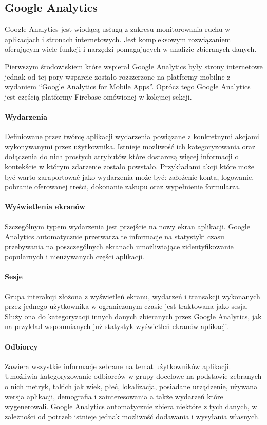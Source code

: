 \subsection{Google Analytics}
Google Analytics jest wiodącą usługą z zakresu monitorowania ruchu w aplikacjach i stronach internetowych. Jest kompleksowym rozwiązaniem oferującym wiele funkcji i narzędzi pomagających w analizie zbieranych danych.

Pierwszym środowiskiem które wspierał Google Analytics były strony internetowe jednak od tej pory wsparcie zostało rozszerzone na platformy mobilne z wydaniem ``Google Analytics for Mobile Apps''. Oprócz tego Google Analytics jest częścią platformy Firebase omówionej w kolejnej sekcji.

\paragraph{Wydarzenia}
Definiowane przez twórcę aplikacji wydarzenia powiązane z konkretnymi akcjami wykonywanymi przez użytkownika. Istnieje możliwość ich kategoryzowania oraz dołączenia do nich prostych atrybutów które dostarczą więcej informacji o kontekście w którym zdarzenie zostało powstało. Przykładami akcji które może być warto zaraportować jako wydarzenia może być: założenie konta, logowanie, pobranie oferowanej treści, dokonanie zakupu oraz wypełnienie formularza.

\paragraph{Wyświetlenia ekranów}
Szczególnym typem wydarzenia jest przejście na nowy ekran aplikacji. Google Analytics automatycznie przetwarza te informacje na statystyki czasu przebywania na poszczególnych ekranach umożliwiające zidentyfikowanie popularnych i nieużywanych części aplikacji.

\paragraph{Sesje}
Grupa interakcji złożona z wyświetleń ekranu, wydarzeń i transakcji wykonanych przez jednego użytkownika w ograniczonym czasie jest traktowana jako sesja. Służy ona do kategoryzacji innych danych zbieranych przez Google Analytics, jak na przykład wspomnianych już statystyk wyświetleń ekranów aplikacji.

\paragraph{Odbiorcy}
Zawiera wszystkie informacje zebrane na temat użytkowników aplikacji. Umożliwia kategoryzowanie odbiorców w grupy docelowe na podstawie zebranych o nich metryk, takich jak wiek, płeć, lokalizacja, posiadane urządzenie, używana wersja aplikacji, demografia i zainteresowania a także wydarzeń które wygenerowali. Google Analytics automatycznie zbiera niektóre z tych danych, w zależności od potrzeb istnieje jednak możliwość dodawania i wysyłania własnych.

